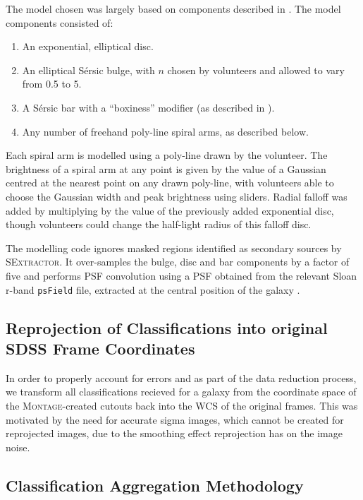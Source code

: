 \documentclass[../main.tex]{subfiles}
\begin{document}
The model chosen was largely based on components described in \citet{galfit-paper}. The model components consisted of:
\begin{enumerate}
\item An exponential, elliptical disc.
\item An elliptical S\'ersic bulge, with $n$ chosen by volunteers and allowed to vary from 0.5 to 5.
\item A S\'ersic bar with a ``boxiness'' modifier (as described in \citealt{galfit-paper}).
\item Any number of freehand poly-line spiral arms, as described below.
\end{enumerate}

Each spiral arm is modelled using a poly-line drawn by the volunteer. The brightness of a spiral arm at any point is given by the value of a Gaussian centred at the nearest point on any drawn poly-line, with volunteers able to choose the Gaussian width and peak brightness using sliders. Radial falloff was added by multiplying by the value of the previously added exponential disc, though volunteers could change the half-light radius of this falloff disc.

The modelling code ignores masked regions identified as secondary sources by \textsc{SExtractor}. It over-samples the bulge, disc and bar components by a factor of five and performs PSF convolution using a PSF obtained from the relevant Sloan r-band \texttt{psField} file, extracted at the central position of the galaxy \citep{2002AJ....123..485S}.


\subsection{Reprojection of Classifications into original SDSS Frame Coordinates}

In order to properly account for errors and as part of the data reduction process, we transform all classifications recieved for a galaxy from the coordinate space of the \textsc{Montage}-created cutouts back into the WCS of the original frames. This was motivated by the need for accurate sigma images, which cannot be created for reprojected images, due to the smoothing effect reprojection has on the image noise.


\subsection{Classification Aggregation Methodology}
\end{document}
